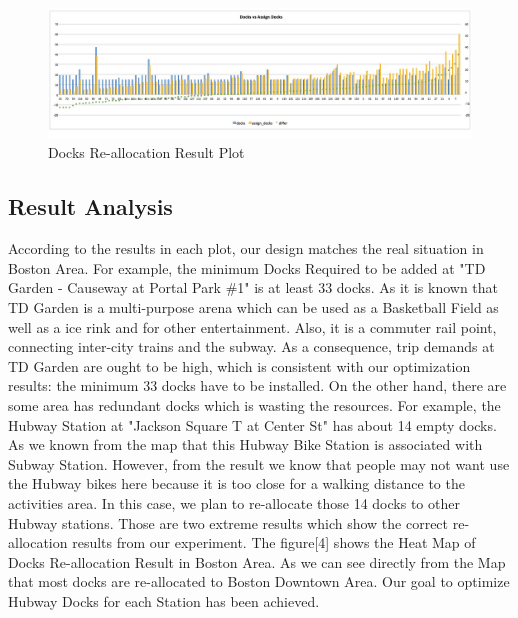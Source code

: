 \documentclass[journal, letterpaper]{IEEEtran}
\begin{document}
\begin{figure}
  \includegraphics[width=1\textwidth]{dockvsassigndock.jpg}
  \caption{Docks Re-allocation Result Plot}
  \label{fig:5}
\end{figure}

\subsection{Result Analysis}
According to the results in each plot, our design matches the real situation in Boston Area. For example, the minimum Docks Required to be added at "TD Garden - Causeway at Portal Park \#1" is at least 33 docks. As it is known that TD Garden is a multi-purpose arena which can be used as a Basketball Field as well as a ice rink and for other entertainment. Also, it is a commuter rail point, connecting inter-city trains and the subway. As a consequence, trip demands at TD Garden are ought to be high, which is consistent with our optimization results: the minimum 33 docks have to be installed. On the other hand, there are some area has redundant docks which is wasting the resources. For example, the Hubway Station at "Jackson Square T at Center St" has about 14 empty docks. As we known from the map that this Hubway Bike Station is associated with Subway Station. However, from the result we know that people may not want use the Hubway bikes here because it is too close for a walking distance to the activities area. In this case, we plan to re-allocate those 14 docks to other Hubway stations. Those are two extreme results which show the correct re-allocation results from our experiment. The figure[4] shows the Heat Map of Docks Re-allocation Result in Boston Area. As we can see directly from the Map that most docks are re-allocated to Boston Downtown Area. Our goal to optimize Hubway Docks for each Station has been achieved.

\end{document}
